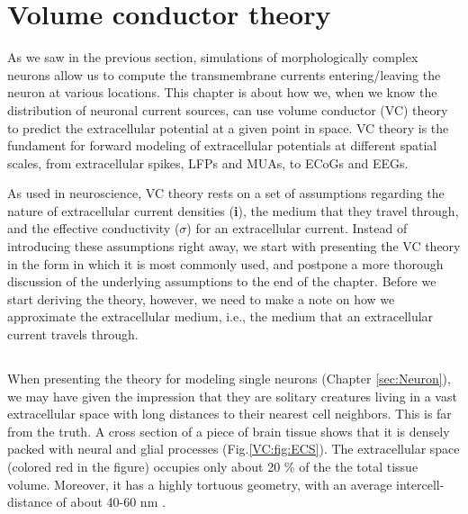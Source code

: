 \section{Volume conductor theory}
\label{sec:VC}


As we saw in the previous section, simulations of morphologically complex neurons allow us to compute the transmembrane currents entering/leaving the neuron at various locations. This chapter is about how we, when we know the distribution of neuronal current sources, can use volume conductor (VC) theory to predict the extracellular potential at a given point in space. VC theory is the fundament for forward modeling of extracellular potentials at different spatial scales, from extracellular spikes, LFPs and MUAs, to ECoGs and EEGs.

As  used in neuroscience, VC theory rests on a set of assumptions regarding the nature of extracellular current densities ({\bf i}), the medium that they travel through, and the effective conductivity ($\sigma$) for an extracellular current. Instead of introducing these assumptions right away, we start with presenting the VC theory in the form in which it is most commonly used, and postpone a more thorough discussion of the underlying assumptions to the end of the chapter. Before we start deriving the theory, however, we need to make a note on how we approximate the extracellular medium, i.e., the medium that an extracellular current travels through.


\subsection{}
\label{sec:continuous}
When presenting the theory for modeling single neurons (Chapter \ref{sec:Neuron}), we may have given the impression that they are solitary creatures living in a vast extracellular space with long distances to their nearest cell neighbors. This is far from the truth. A cross section of a piece of brain tissue shows that it is densely packed with neural and glial processes (Fig.\ref{VC:fig:ECS}). The extracellular space (colored red in the figure) occupies only about 20 \% of the the total tissue volume. Moreover, it has a highly tortuous geometry, with an average intercell-distance of about 40-60 nm \citep{Sykova2008}. 

